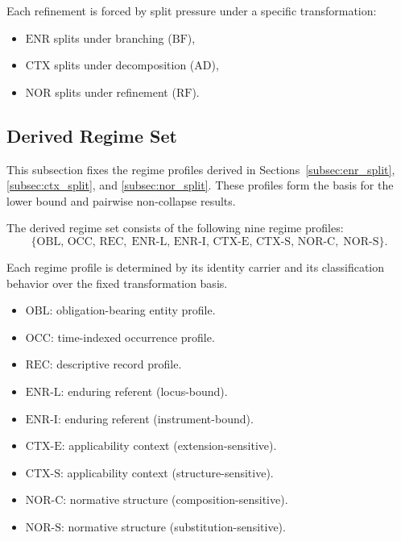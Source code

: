 Each refinement is forced by split pressure under a specific transformation:

\begin{itemize}
\item $\mathrm{ENR}$ splits under branching ($\mathrm{BF}$),
\item $\mathrm{CTX}$ splits under decomposition ($\mathrm{AD}$),
\item $\mathrm{NOR}$ splits under refinement ($\mathrm{RF}$).
\end{itemize}

\subsection{Derived Regime Set}
\label{subsec:derived_regime_set}

This subsection fixes the regime profiles derived in
Sections~\ref{subsec:enr_split}, \ref{subsec:ctx_split}, and \ref{subsec:nor_split}.
These profiles form the basis for the lower bound and pairwise non-collapse results.

\begin{definition}
\label{def:derived_regime_set}
The derived regime set consists of the following nine regime profiles:
\[
\{
\mathrm{OBL},\,
\mathrm{OCC},\,
\mathrm{REC},\;
\mathrm{ENR\mbox{-}L},\,
\mathrm{ENR\mbox{-}I},\,
\mathrm{CTX\mbox{-}E},\,
\mathrm{CTX\mbox{-}S},\,
\mathrm{NOR\mbox{-}C},\;
\mathrm{NOR\mbox{-}S}
\}.
\]
\end{definition}

Each regime profile is determined by its identity carrier
and its classification behavior over the fixed transformation basis.

\begin{itemize}
  \item $\mathrm{OBL}$: obligation-bearing entity profile.
  \item $\mathrm{OCC}$: time-indexed occurrence profile.
  \item $\mathrm{REC}$: descriptive record profile.
  \item $\mathrm{ENR\mbox{-}L}$: enduring referent (locus-bound).
  \item $\mathrm{ENR\mbox{-}I}$: enduring referent (instrument-bound).
  \item $\mathrm{CTX\mbox{-}E}$: applicability context (extension-sensitive).
  \item $\mathrm{CTX\mbox{-}S}$: applicability context (structure-sensitive).
  \item $\mathrm{NOR\mbox{-}C}$: normative structure (composition-sensitive).
  \item $\mathrm{NOR\mbox{-}S}$: normative structure (substitution-sensitive).
\end{itemize}


